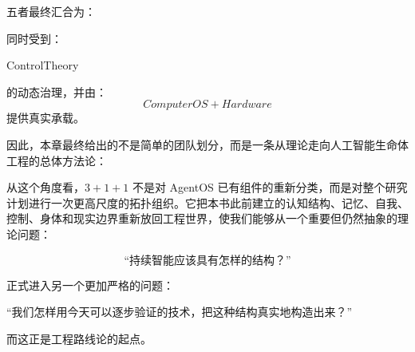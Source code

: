 五者最终汇合为：
\begin{statementbox}
\centering
{}
\end{statementbox}
同时受到：
\begin{statementbox}
ControlTheory
\end{statementbox}
的动态治理，并由：
\[
\boxed{
ComputerOS+Hardware
}
\]
提供真实承载。

因此，本章最终给出的不是简单的团队划分，而是一条从理论走向人工智能生命体工程的总体方法论：

\begin{statementbox}
\centering
{}
\end{statementbox}

从这个角度看，$3+1+1$ 不是对 AgentOS 已有组件的重新分类，而是对整个研究计划进行一次更高尺度的拓扑组织。它把本书此前建立的认知结构、记忆、自我、控制、身体和现实边界重新放回工程世界，使我们能够从一个重要但仍然抽象的理论问题：

\[
\text{``持续智能应该具有怎样的结构？''}
\]

正式进入另一个更加严格的问题：

\begin{statementbox}
``我们怎样用今天可以逐步验证的技术，把这种结构真实地构造出来？''
\end{statementbox}

而这正是工程路线论的起点。
